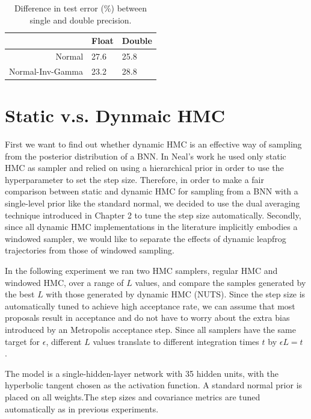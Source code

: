 \documentclass[12pt]{report}
\begin{document}
\begin{table}[]
\centering
\begin{tabular}{@{}rll@{}}
\toprule
\multicolumn{1}{l}{} & Float & \multicolumn{1}{r}{Double} \\ \midrule
Normal               & 27.6   & 25.8                         \\ \midrule
Normal-Inv-Gamma     & 23.2  & 28.8                         \\ \bottomrule
\end{tabular}
\caption{Difference in test error ($\%$) between single and double precision.}
\end{table}

\section{Static v.s. Dynmaic HMC}

First we want to find out whether dynamic HMC is an effective way of sampling from the posterior distribution of a BNN. In Neal's work \cite{neal2012bayesian} he used only static HMC as sampler and relied on using a hierarchical prior in order to use the hyperparameter to set the step size. Therefore, in order to make a fair comparison between static and dynamic HMC for sampling from a BNN with a single-level prior like the standard normal, we decided to use the dual averaging technique introduced in Chapter 2 to tune the step size automatically. 
Secondly, since all dynamic HMC implementations in the literature implicitly embodies a windowed sampler, we would like to separate the effects of dynamic leapfrog trajectories from those of windowed sampling. 
 
In the following experiment we ran two HMC samplers, regular HMC and windowed HMC, over a range of $L$ values, and compare the samples generated by the best $L$ with those generated by dynamic HMC (NUTS). Since the step size is automatically tuned to achieve high acceptance rate, we can assume that most proposals result in acceptance and do not have to worry about the extra bias introduced by an Metropolis acceptance step. Since all samplers have the same target for $\epsilon$, different $L$ values translate to different integration times $t$ by $\epsilon L = t$ .

The model is a single-hidden-layer network with 35 hidden units, with the hyperbolic tangent chosen as the activation function. A standard normal prior is placed on all weights.The step sizes and covariance metrics are tuned automatically as in previous experiments. 
\end{document}
